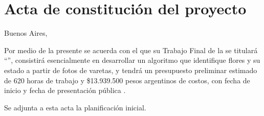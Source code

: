\documentclass[
11pt, %
]{charter}
\begin{document}
\section*{Acta de constitución del proyecto}
\label{sec:acta}

\begin{flushright}
Buenos Aires, \fechaInicioName
\end{flushright}

\vspace{2cm}

Por medio de la presente se acuerda con el \authorname\hspace{1px} que su Trabajo Final de la \degreename\hspace{1px} se titulará ``\ttitle'', consistirá esencialmente en desarrollar un algoritmo que identifique flores y su estado a partir de fotos de varetas, y tendrá un presupuesto preliminar estimado de 620 horas de trabajo y \$13.939.500 pesos argentinos de costos, con fecha de inicio \fechaInicioName\hspace{1px} y fecha de presentación pública \fechaFinalName.

Se adjunta a esta acta la planificación inicial.

\vfill
\end{document}
